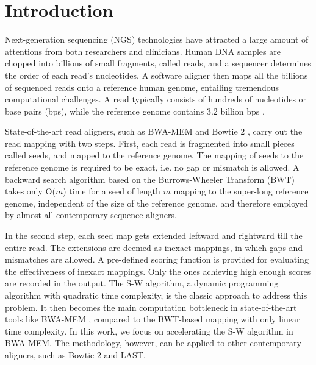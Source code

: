 \section{Introduction} 
\label{sec:introduction}

Next-generation sequencing (NGS) technologies have attracted a large amount of attentions from both researchers and clinicians. 
Human DNA samples are chopped into billions of small fragments, called reads, and a sequencer determines the order of each read's nucleotides. 
A software aligner then maps all the billions of sequenced reads onto a reference human genome, entailing tremendous computational challenges.
A read typically consists of hundreds of nucleotides or base pairs (bps), while the reference genome contains 3.2 billion bps \cite{Mardis2008}.

State-of-the-art read aligners, such as BWA-MEM \cite{BWA-MEM} and Bowtie 2 \cite{Bowtie}\cite{Bowtie2}, 
carry out the read mapping with two steps. 
First, each read is fragmented into small pieces called seeds, and mapped to the reference genome. 
The mapping of seeds to the reference genome is required to be exact, i.e. no gap or mismatch is allowed. 
A backward search algorithm based on the Burrows-Wheeler Transform (BWT) \cite{BWT} takes only O($m$) time for a seed of length $m$ mapping to the super-long reference genome, independent of the size of the reference genome, and therefore employed by almost all contemporary sequence aligners.

In the second step, each seed map gets extended leftward and rightward till the entire read. 
The extensions are deemed as inexact mappings, in which gaps and mismatches are allowed. A pre-defined scoring function is provided for evaluating the effectiveness of inexact mappings. Only the ones achieving high enough scores are recorded in the output. 
The S-W algorithm, a dynamic programming algorithm with quadratic time complexity, is the classic approach to address this problem. 
It then becomes the main computation bottleneck in state-of-the-art tools like BWA-MEM \cite{BWA-MEM}, 
compared to the BWT-based mapping with only linear time complexity. 
In this work, we focus on accelerating the S-W algorithm in BWA-MEM. The methodology, however, can be applied to other contemporary aligners, such as Bowtie 2 and LAST. 

